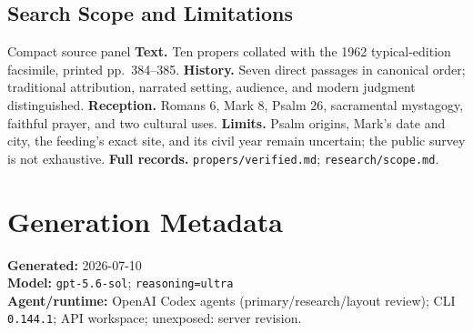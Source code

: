 \begin{deepstudy}
\subsection*{Search Scope and Limitations}

\begin{studybox}{Compact source panel}
\textbf{Text.} Ten propers collated with the 1962 typical-edition facsimile, printed pp.~384--385. \textbf{History.} Seven direct passages in canonical order; traditional attribution, narrated setting, audience, and modern judgment distinguished. \textbf{Reception.} Romans 6, Mark 8, Psalm 26, sacramental mystagogy, faithful prayer, and two cultural uses. \textbf{Limits.} Psalm origins, Mark's date and city, the feeding's exact site, and its civil year remain uncertain; the public survey is not exhaustive. \textbf{Full records.} \nolinkurl{propers/verified.md}; \nolinkurl{research/scope.md}.
\end{studybox}

\section*{Generation Metadata}

{\footnotesize
\textbf{Generated:} 2026-07-10\\
\textbf{Model:} \texttt{gpt-5.6-sol}; \texttt{reasoning=ultra}\\
\textbf{Agent/runtime:} OpenAI Codex agents (primary/research/layout review); CLI \texttt{0.144.1}; API workspace; unexposed: server revision.\par
}

\end{deepstudy}

